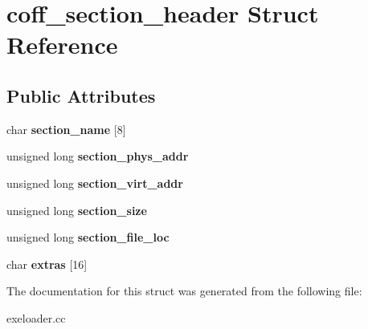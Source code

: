 \hypertarget{structcoff__section__header}{
\section{coff\_\-section\_\-header Struct Reference}
\label{structcoff__section__header}
}
\subsection*{Public Attributes}
\begin{DoxyCompactItemize}
\item 
\hypertarget{structcoff__section__header_afd97540c559f1bb92df3c41a6484bea6}{
char {\bfseries section\_\-name} \mbox{[}8\mbox{]}}
\label{structcoff__section__header_afd97540c559f1bb92df3c41a6484bea6}

\item 
\hypertarget{structcoff__section__header_a23f345450c1f0a06ae535bae85712f22}{
unsigned long {\bfseries section\_\-phys\_\-addr}}
\label{structcoff__section__header_a23f345450c1f0a06ae535bae85712f22}

\item 
\hypertarget{structcoff__section__header_a308acfd379d401e4060ce5c0183964c0}{
unsigned long {\bfseries section\_\-virt\_\-addr}}
\label{structcoff__section__header_a308acfd379d401e4060ce5c0183964c0}

\item 
\hypertarget{structcoff__section__header_a2b3eca9648679d9118f1e869497e72a0}{
unsigned long {\bfseries section\_\-size}}
\label{structcoff__section__header_a2b3eca9648679d9118f1e869497e72a0}

\item 
\hypertarget{structcoff__section__header_a365990abf98c4d9e75bbb3def6bb647c}{
unsigned long {\bfseries section\_\-file\_\-loc}}
\label{structcoff__section__header_a365990abf98c4d9e75bbb3def6bb647c}

\item 
\hypertarget{structcoff__section__header_a3ae677fccda07e651da1d81186d857b4}{
char {\bfseries extras} \mbox{[}16\mbox{]}}
\label{structcoff__section__header_a3ae677fccda07e651da1d81186d857b4}

\end{DoxyCompactItemize}


The documentation for this struct was generated from the following file:\begin{DoxyCompactItemize}
\item 
exeloader.cc\end{DoxyCompactItemize}
